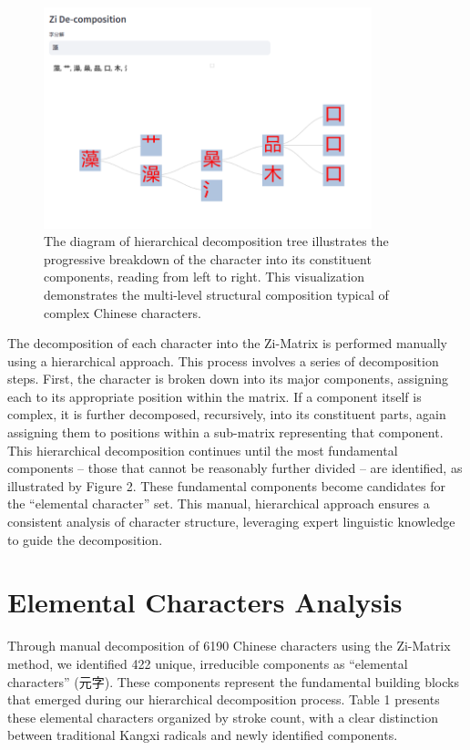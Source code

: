 \documentclass[11pt,letterpaper]{article}
\begin{document}
\begin{figure}
  \centering
  \includegraphics[width=0.85\textwidth]{./images/app_decomposing-zi.png}
  \caption{The diagram of hierarchical decomposition tree illustrates the
  progressive breakdown of the character into its constituent components,
  reading from left to right. This visualization demonstrates the
  multi-level structural composition typical of complex Chinese
  characters.}
\end{figure}

The decomposition of each character into the Zi-Matrix is performed
manually using a hierarchical approach. This process involves a series
of decomposition steps. First, the character is broken down into its
major components, assigning each to its appropriate position within the
matrix. If a component itself is complex, it is further decomposed,
recursively, into its constituent parts, again assigning them to
positions within a sub-matrix representing that component. This
hierarchical decomposition continues until the most fundamental
components -- those that cannot be reasonably further divided -- are
identified, as illustrated by Figure 2. These fundamental components become candidates for the
``elemental character'' set. This manual, hierarchical approach ensures
a consistent analysis of character structure, leveraging
expert linguistic knowledge to guide the decomposition.



\section{Elemental Characters Analysis}\label{elemental-characters-analysis}

Through manual decomposition of 6190 Chinese characters using the
Zi-Matrix method, we identified 422 unique, irreducible components as
``elemental characters'' (元字). These components represent the
fundamental building blocks that emerged during our hierarchical
decomposition process. Table 1 presents these elemental characters
organized by stroke count, with a clear distinction between traditional
Kangxi radicals and newly identified components.
\end{document}
